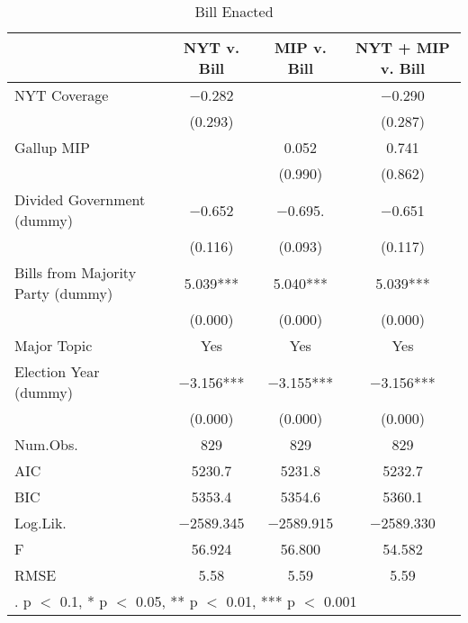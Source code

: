 \documentclass[here]{article}
\begin{document}
\begin{table}

  \caption{Bill Enacted}
  \centering
  \begin{tabular}[t]{lccc}
  \toprule
    & NYT v. Bill & MIP v. Bill & NYT + MIP v. Bill\\
  \midrule
  NYT Coverage & \num{-0.282} &  & \num{-0.290}\\
    & (\num{0.293}) &  & (\num{0.287})\\
  Gallup MIP &  & \num{0.052} & \num{0.741}\\
    &  & (\num{0.990}) & (\num{0.862})\\
  Divided Government (dummy) & \num{-0.652} & \num{-0.695}. & \num{-0.651}\\
    & (\num{0.116}) & (\num{0.093}) & (\num{0.117})\\
  Bills from Majority Party (dummy) & \num{5.039}*** & \num{5.040}*** & \num{5.039}***\\
    & (\num{0.000}) & (\num{0.000}) & \vphantom{1} (\num{0.000})\\
  Major Topic & Yes & Yes & Yes\\
  Election Year (dummy) & \num{-3.156}*** & \num{-3.155}*** & \num{-3.156}***\\
    & (\num{0.000}) & (\num{0.000}) & (\num{0.000})\\
  Num.Obs. & \num{829} & \num{829} & \num{829}\\
  \midrule
  AIC & \num{5230.7} & \num{5231.8} & \num{5232.7}\\
  BIC & \num{5353.4} & \num{5354.6} & \num{5360.1}\\
  Log.Lik. & \num{-2589.345} & \num{-2589.915} & \num{-2589.330}\\
  F & \num{56.924} & \num{56.800} & \num{54.582}\\
  RMSE & \num{5.58} & \num{5.59} & \num{5.59}\\
  \bottomrule
  \multicolumn{4}{l}{\rule{0pt}{1em}. p $<$ 0.1, * p $<$ 0.05, ** p $<$ 0.01, *** p $<$ 0.001}\\
  \end{tabular}
  \end{table}
\end{document}
